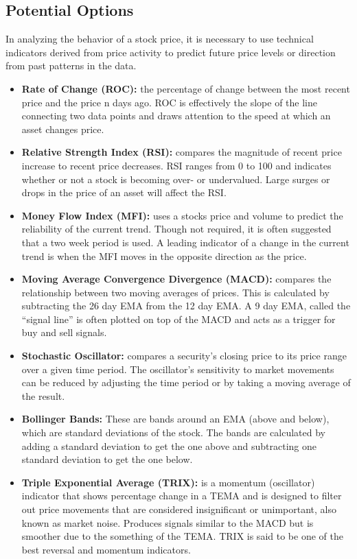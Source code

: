 \documentclass[11pt]{article}
\newcommand*\apos{\textsc{\char13}}
\begin{document}
\subsection*{Potential Options}\label{POp}
In analyzing the behavior of a stock price, it is necessary to use technical indicators derived from price activity to predict future price levels or direction from past patterns in the data.
\begin{itemize}
\item \textbf{Rate of Change (ROC):} the percentage of change between the most recent price and the price n days ago. ROC is effectively the slope of the line connecting two data points and draws attention to the speed at which an asset changes price.
\item \textbf{Relative Strength Index (RSI):} compares the magnitude of recent price increase to recent price decreases. RSI ranges from 0 to 100 and indicates whether or not a stock is becoming over- or undervalued. Large surges or drops in the price of an asset will affect the RSI.
\item \textbf{Money Flow Index (MFI):} uses a stock\apos s price and volume to predict the reliability of the current trend. Though not required, it is often suggested that a two week period is used. A leading indicator of a change in the current trend is when the MFI moves in the opposite direction as the price.
\item \textbf{Moving Average Convergence Divergence (MACD):} compares the relationship between two moving averages of prices. This is calculated by subtracting the 26 day EMA from the 12 day EMA. A 9 day EMA, called the ``signal line” is often plotted on top of the MACD and acts as a trigger for buy and sell signals.
\item \textbf{Stochastic Oscillator:} compares a security’s closing price to its price range over a given time period. The oscillator’s sensitivity to market movements can be reduced by adjusting the time period or by taking a moving average of the result. 
\item \textbf{Bollinger Bands:} These are bands around an EMA (above and below), which are standard deviations of the stock. The bands are calculated by adding a standard deviation to get the one above and subtracting one standard deviation to get the one below. 
\item \textbf{Triple Exponential Average (TRIX):} is a momentum (oscillator) indicator that shows percentage change in a TEMA and is designed to filter out price movements that are considered insignificant or unimportant, also known as market noise. Produces signals similar to the MACD but is smoother due to the something of the TEMA. TRIX is said to be one of the best reversal and momentum indicators.\textsuperscript{\cite{INV}}

\end{itemize}
\end{document}

